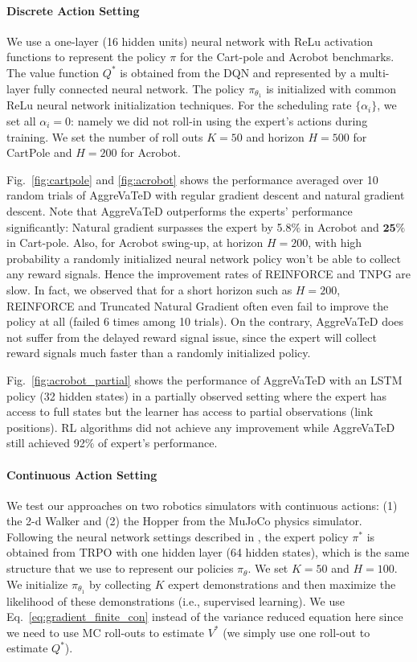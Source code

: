 \documentclass{article}
\begin{document}
\paragraph{Discrete Action Setting} We use a one-layer (16 hidden units) neural network with ReLu activation functions to represent the policy $\pi$ for the Cart-pole and Acrobot benchmarks. The value function $Q^*$ is obtained from the DQN \cite{mnih2015human} and represented by a multi-layer fully connected neural network. The policy $\pi_{\theta_1}$ is initialized with common ReLu neural network initialization techniques. For the scheduling rate $\{\alpha_i\}$, we set all $\alpha_i = 0$: namely we did not roll-in using the expert's actions during training.  We set the number of roll outs $K = 50$ and horizon $H = 500$ for CartPole and $H = 200$ for Acrobot.



Fig.~\ref{fig:cartpole} and \ref{fig:acrobot} shows the performance averaged over 10 random trials of AggreVaTeD with regular gradient descent and natural gradient descent. Note that AggreVaTeD outperforms the experts' performance significantly: Natural gradient surpasses the expert by 5.8$\%$ in Acrobot and $\mathbf{25\%}$ in Cart-pole. Also, for Acrobot swing-up, at horizon $H=200$, with high probability a randomly initialized neural network policy won't be able to collect any reward signals. Hence the improvement rates of REINFORCE and TNPG are slow. In fact, we observed that for a short horizon such as $H=200$, REINFORCE and Truncated Natural Gradient often even fail to improve the policy at all (failed 6 times among 10 trials). On the contrary, AggreVaTeD does not suffer from the delayed reward signal issue, since the expert will collect reward signals much faster than a randomly initialized policy. 

Fig.~\ref{fig:acrobot_partial} shows the performance of AggreVaTeD with an LSTM policy (32 hidden states) in a partially observed setting where the expert has access to full states but the learner has access to partial observations (link positions). RL algorithms did not achieve any improvement while AggreVaTeD still achieved 92$\%$ of expert's performance.

\vspace{-5pt}
\paragraph{Continuous Action Setting}
We test our approaches on two robotics simulators with continuous actions: (1) the 2-d Walker and (2) the Hopper from the MuJoCo physics simulator. Following the neural network settings described in \citet{schulman2015trust}, the expert policy $\pi^*$ is obtained from TRPO with one hidden layer (64 hidden states), which is the same structure that we use to represent our policies $\pi_{\theta}$. We set $K = 50$ and $H = 100$. We initialize $\pi_{\theta_1}$ by collecting $K$ expert demonstrations and then maximize the likelihood of these demonstrations (i.e., supervised learning). We use Eq.~\ref{eq:gradient_finite_con} instead of the variance reduced equation here since we need to use MC roll-outs to estimate $V^*$ (we simply use one roll-out to estimate $Q^*$). %
\end{document}
